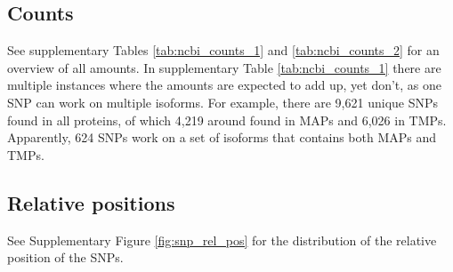 



\clearpage

\subsection{Counts}
\label{subsec:counts}

See supplementary Tables \ref{tab:ncbi_counts_1} and \ref{tab:ncbi_counts_2}
for an overview of all amounts.
In supplementary Table \ref{tab:ncbi_counts_1} there are multiple instances where
the amounts are expected to add up, yet don't, as one SNP can work on
multiple isoforms. For example, there are 9,621 unique SNPs 
found in all proteins, of which 4,219 around found in MAPs 
and 6,026 in TMPs. Apparently, 624 SNPs work on a set of isoforms that
contains both MAPs and TMPs.





\clearpage

\subsection{Relative positions}

See Supplementary Figure \ref{fig:snp_rel_pos}
for the distribution of the relative position of the SNPs.

